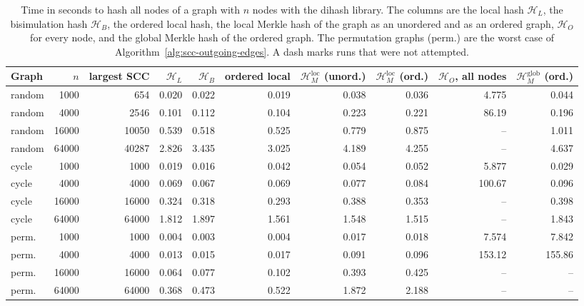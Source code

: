 \documentclass[twoside,leqno]{article}
\newcommand{\HL}{\mathcal{H}_{L}}
\newcommand{\HB}{\mathcal{H}_{B}}
\newcommand{\HO}{\mathcal{H}_{O}}
\newcommand{\HMg}{\mathcal{H}_{M}^{\mathrm{glob}}}
\newcommand{\HMl}{\mathcal{H}_{M}^{\mathrm{loc}}}
\begin{document}
\begin{table}[t]
\centering
\caption{Time in seconds to hash all nodes of a graph with $n$ nodes with the dihash library. The columns are the local hash $\HL$, the bisimulation hash $\HB$, the ordered local hash, the local Merkle hash of the graph as an unordered and as an ordered graph, $\HO$ for every node, and the global Merkle hash of the ordered graph. The permutation graphs (perm.) are the worst case of Algorithm~\ref{alg:scc-outgoing-edges}. A dash marks runs that were not attempted.}
\label{tab:scaling}
\small
\setlength{\tabcolsep}{4pt}
\begin{tabular}{@{}lrrrrrrrrr@{}}
\toprule
Graph & $n$ & largest SCC & $\HL$ & $\HB$ & ordered local & $\HMl$ (unord.) & $\HMl$ (ord.) & $\HO$, all nodes & $\HMg$ (ord.) \\
\midrule
random & 1000  & 654   & 0.020 & 0.022 & 0.019 & 0.038 & 0.036 & 4.775  & 0.044 \\
random & 4000  & 2546  & 0.101 & 0.112 & 0.104 & 0.223 & 0.221 & 86.19  & 0.196 \\
random & 16000 & 10050 & 0.539 & 0.518 & 0.525 & 0.779 & 0.875 & --     & 1.011 \\
random & 64000 & 40287 & 2.826 & 3.435 & 3.025 & 4.189 & 4.255 & --     & 4.637 \\
cycle  & 1000  & 1000  & 0.019 & 0.016 & 0.042 & 0.054 & 0.052 & 5.877  & 0.029 \\
cycle  & 4000  & 4000  & 0.069 & 0.067 & 0.069 & 0.077 & 0.084 & 100.67 & 0.096 \\
cycle  & 16000 & 16000 & 0.324 & 0.318 & 0.293 & 0.388 & 0.353 & --     & 0.398 \\
cycle  & 64000 & 64000 & 1.812 & 1.897 & 1.561 & 1.548 & 1.515 & --     & 1.843 \\
perm.  & 1000  & 1000  & 0.004 & 0.003 & 0.004 & 0.017 & 0.018 & 7.574  & 7.842 \\
perm.  & 4000  & 4000  & 0.013 & 0.015 & 0.017 & 0.091 & 0.096 & 153.12 & 155.86 \\
perm.  & 16000 & 16000 & 0.064 & 0.077 & 0.102 & 0.393 & 0.425 & --     & -- \\
perm.  & 64000 & 64000 & 0.368 & 0.473 & 0.522 & 1.872 & 2.188 & --     & -- \\
\bottomrule
\end{tabular}
\end{table}
\end{document}
